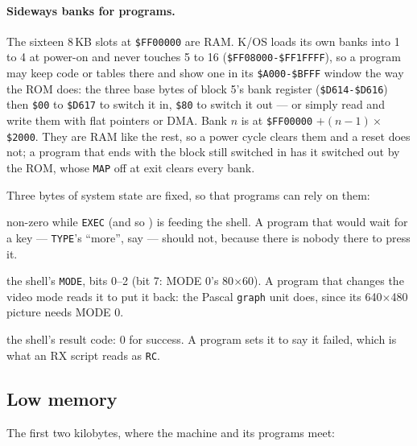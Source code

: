 \paragraph{Sideways banks for programs.} The sixteen 8\,KB slots at
\texttt{\$FF00000} are RAM. K/OS loads its own banks into 1 to 4 at power-on
and never touches 5 to 16 (\texttt{\$FF08000-\$FF1FFFF}), so a program may
keep code or tables there and show one in its \texttt{\$A000-\$BFFF} window
the way the ROM does: the three base bytes of block 5's bank register
(\texttt{\$D614-\$D616}) then \texttt{\$00} to \texttt{\$D617} to switch it in,
\texttt{\$80} to switch it out --- or simply read and write them with flat
pointers or DMA. Bank $n$ is at \texttt{\$FF00000} $+ (n-1)\times$\texttt{\$2000}.
They are RAM like the rest, so a power cycle clears them and a reset does
not; a program that ends with the block still switched in has it switched
out by the ROM, whose \verb|MAP| off at exit clears every bank.

\noindent Three bytes of system state are fixed, so that programs can
rely on them:

\begin{description}[leftmargin=1.4em,style=nextline]
\item[\texttt{\$022E} --- a script is running] non-zero while \verb|EXEC|
  (and so ) is feeding the shell. A program that would
  wait for a key --- \verb|TYPE|'s ``more'', say --- should not, because
  there is nobody there to press it.
\item[\texttt{\$022F} --- the console's mode] the shell's \verb|MODE|,
  bits 0--2 (bit 7: MODE 0's 80$\times$60). A program that changes the
  video mode reads it to put it back: the Pascal \texttt{graph} unit
  does, since its 640$\times$480 picture needs MODE 0.
\item[\texttt{\$03FF} --- the result] the shell's result code: 0 for
  success. A program sets it to say it failed, which is what an RX
  script reads as \verb|RC|.
\end{description}

\subsection{Low memory}\label{sec:lowmem}
The first two kilobytes, where the machine and its programs meet:

